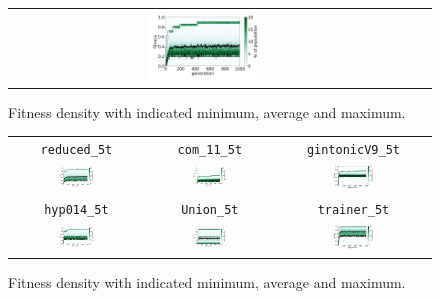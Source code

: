 \documentclass[11pt,a4paper]{scrartcl}
\begin{document}
\begin{figure}[H]
\begin{tabular}{ccc}
\includegraphics[width=0.3\textwidth]{img/standard_trainer.png}
\end{tabular}
\caption{Fitness density with indicated minimum, average and maximum.}
\label{fig:standard}
\end{figure}


\begin{figure}[H]
\center
\begin{tabular}{ccc}
\texttt{reduced\_5t} & \texttt{com\_11\_5t} & \texttt{gintonicV9\_5t} \\
\includegraphics[width=0.3\textwidth]{img/standard_reduced_5t.png} &
\includegraphics[width=0.3\textwidth]{img/standard_com_11_5t.png} &
\includegraphics[width=0.3\textwidth]{img/standard_gintonicV9_5t.png} \\
\texttt{hyp014\_5t} & \texttt{Union\_5t} & \texttt{trainer\_5t} \\
\includegraphics[width=0.3\textwidth]{img/standard_hyp014_5t.png} &
\includegraphics[width=0.3\textwidth]{img/standard_Union_5t.png} &
\includegraphics[width=0.3\textwidth]{img/standard_trainer_5t.png}
\end{tabular}
\caption{Fitness density with indicated minimum, average and maximum.}
\label{fig:standard_5t}
\end{figure}
\end{document}
